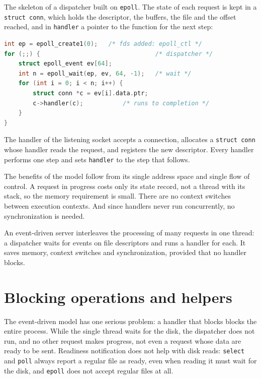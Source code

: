 \documentclass[../main.tex]{subfiles}
\begin{document}
\begin{example}
  The skeleton of a dispatcher built on \texttt{epoll}.  The state of each
  request is kept in a \texttt{struct conn}, which holds the descriptor,
  the buffers, the file and the offset reached, and in \texttt{handler} a
  pointer to the function for the next step:
  \begin{lstlisting}[language=C, numbers=none]
int ep = epoll_create1(0);   /* fds added: epoll_ctl */
for (;;) {                                /* dispatcher */
    struct epoll_event ev[64];
    int n = epoll_wait(ep, ev, 64, -1);   /* wait */
    for (int i = 0; i < n; i++) {
        struct conn *c = ev[i].data.ptr;
        c->handler(c);           /* runs to completion */
    }
}
\end{lstlisting}
  The handler of the listening socket accepts a connection, allocates a
  \texttt{struct conn} whose handler reads the request, and registers the
  new descriptor.  Every handler performs one step and sets
  \texttt{handler} to the step that follows.
\end{example}

The benefits of the model follow from its single address space and single
flow of control.  A request in progress costs only its state record, not a
thread with its stack, so the memory requirement is small.  There are no
context switches between execution contexts.  And since handlers never run
concurrently, no synchronization is needed.

\begin{keypoint}
  An event-driven server interleaves the processing of many requests in one
  thread: a dispatcher waits for events on file descriptors and runs a
  handler for each.  It saves memory, context switches and synchronization,
  provided that no handler blocks.
\end{keypoint}

\section{Blocking operations and helpers}
\label{sec:l06-helpers}

The event-driven model has one serious problem: a handler that blocks
blocks the entire process.  While the single thread waits for the
disk, the dispatcher does not run, and no other request makes progress, not
even a request whose data are ready to be sent.  Readiness notification
does not help with disk reads: \texttt{select} and \texttt{poll} always
report a regular file as ready, even when reading it must wait for the
disk, and \texttt{epoll} does not accept regular files at all.
\end{document}
